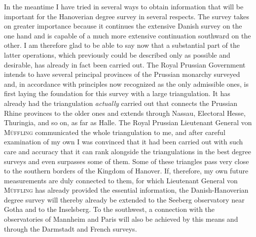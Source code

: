 \par{}%
In the meantime I have tried in several ways to obtain information that will be important for the Hanoverian degree survey in several respects. The survey takes on greater importance because it continues the extensive Danish survey on the one hand and is capable of a much more extensive continuation southward on the other. I am therefore glad to be able to say now that a substantial part of the latter operations, which previously could be described only as possible and desirable, has already in fact been carried out. The Royal Prussian Government intends to have several principal provinces of the Prussian monarchy surveyed and, in accordance with principles now recognized as the only admissible ones, is first laying the foundation for this survey with a large triangulation. It has already had the triangulation \textit{actually} carried out that connects the Prussian Rhine provinces to the older ones and extends through Nassau, Electoral Hesse, Thuringia, and so on, as far as Halle. The Royal Prussian Lieutenant General von \textsc{Müffling} communicated the whole triangulation to me, and after careful examination of my own I was convinced that it had been carried out with such care and accuracy that it can rank alongside the triangulations in the best degree surveys and even surpasses some of them. Some of these triangles pass very close to the southern borders of the Kingdom of Hanover. If, therefore, my own future measurements are duly connected to them, for which Lieutenant General von \textsc{Müffling} has already provided the essential information, the Danish-Hanoverian degree survey will thereby already be extended to the Seeberg observatory near Gotha and to the Inselsberg. To the southwest, a connection with the observatories of Mannheim and Paris will also be achieved by this means and through the Darmstadt and French surveys.

